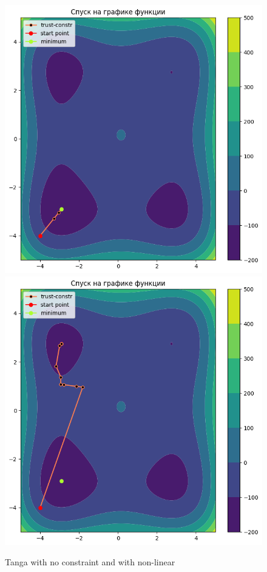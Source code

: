 \documentclass[12pt, a4paper, oneside, final]{article}
\begin{document}
	\begin{figure}[H]
		\centering
		\includegraphics[scale = 0.47]{Image/AT_TANGA_MINIMUM_NO_CONSTRAINT.png}
		\includegraphics[scale = 0.47]{Image/AT_TANGA_MINIMUM_NONLINEAR_CONSTRAINT.png}
		\caption*{Tanga with no constraint and with non-linear}
	\end{figure}
\end{document}
